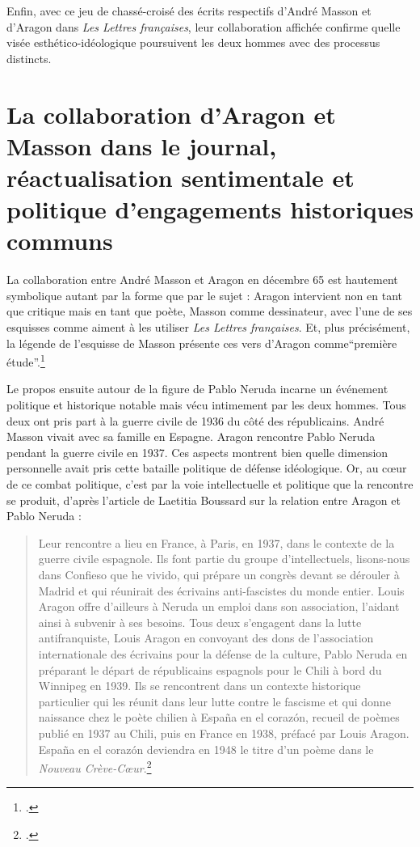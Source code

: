 	Enfin, avec ce jeu de chassé-croisé des écrits respectifs d’André Masson et d’Aragon dans \emph{Les Lettres françaises}, leur collaboration affichée confirme quelle visée esthético-idéologique poursuivent les deux hommes avec des processus distincts.

\section{La collaboration d’Aragon et Masson dans le journal, réactualisation sentimentale et politique d’engagements historiques communs}

La collaboration entre André Masson et Aragon en décembre 65 est hautement symbolique autant par la forme que par le sujet : Aragon intervient non en tant que critique mais en tant que poète, Masson comme dessinateur, avec l’une de ses esquisses comme aiment à les utiliser \emph{Les Lettres françaises}. Et, plus précisément, la légende de l’esquisse de Masson présente ces vers d’Aragon comme\enquote{première étude}.\footcite{pabloneruda}

	 Le propos ensuite autour de la figure de Pablo Neruda incarne un événement politique et historique notable mais vécu intimement par les deux hommes. Tous deux ont pris part à la guerre civile de 1936 du côté des républicains. André Masson vivait avec sa famille en Espagne. Aragon rencontre Pablo Neruda pendant la guerre civile en 1937. Ces aspects montrent bien quelle dimension personnelle avait pris cette bataille politique de défense idéologique. Or, au c\oe{}ur de ce combat politique, c’est par la voie intellectuelle et politique que la rencontre se produit, d’après l’article de Laetitia Boussard sur la relation entre Aragon et Pablo Neruda :


\begin{quote}
Leur rencontre a lieu en France, à Paris, en 1937, dans le contexte de la guerre civile espagnole. Ils font partie du groupe d’intellectuels, lisons-nous dans Confieso que he vivido, qui prépare un congrès devant se dérouler à Madrid et qui réunirait des écrivains anti-fascistes du monde entier. Louis Aragon offre d’ailleurs à Neruda un emploi dans son association, l’aidant ainsi à subvenir à ses besoins. Tous deux s’engagent dans la lutte antifranquiste, Louis Aragon en convoyant des dons de l’association internationale des écrivains pour la défense de la culture, Pablo Neruda en préparant le départ de républicains espagnols pour le Chili à bord du Winnipeg en 1939. Ils se rencontrent dans un contexte historique particulier qui les réunit dans leur lutte contre le fascisme et qui donne naissance chez le poète chilien à España en el corazón, recueil de poèmes publié en 1937 au Chili, puis en France en 1938, préfacé par Louis Aragon. España en el corazón deviendra en 1948 le titre d’un poème dans le \emph{Nouveau Crève-Cœur}.\footcite{aragonaneruda}\end{quote}	 

